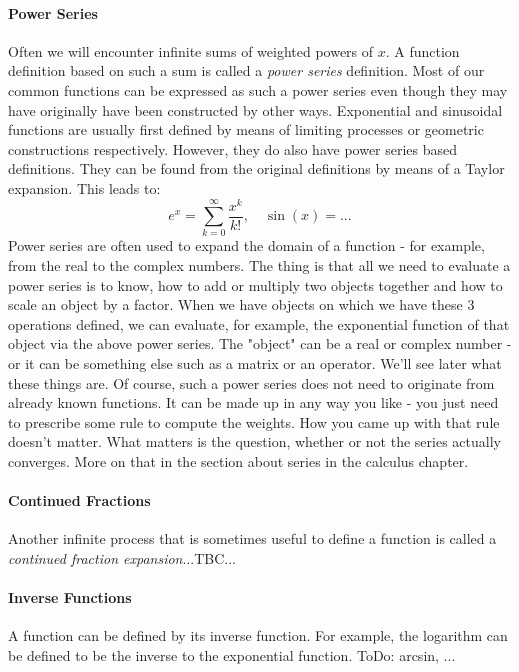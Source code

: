 \paragraph{Power Series}
Often we will encounter infinite sums of weighted powers of $x$. A function definition based on such a sum is called a \emph{power series} definition. Most of our common functions can be expressed as such a power series even though they may have originally have been constructed by other ways. Exponential and sinusoidal functions are usually first defined by means of limiting processes or geometric constructions respectively. However, they do also have power series based definitions. They can be found from the original definitions by means of a Taylor expansion. This leads to:
\begin{equation}
e^x = \sum_{k=0}^\infty \frac{x^k}{k!}, \quad
\sin(x) = ...
\end{equation}
Power series are often used to expand the domain of a function - for example, from the real to the complex numbers. The thing is that all we need to evaluate a power series is to know, how to add or multiply two objects together and how to scale an object by a factor. When we have objects on which we have these 3 operations defined, we can evaluate, for example, the exponential function of that object via the above power series. The "object" can be a real or complex number - or it can be something else such as a matrix or an operator. We'll see later what these things are. Of course, such a power series does not need to originate from already known functions. It can be made up in any way you like - you just need to prescribe some rule to compute the weights. How you came up with that rule doesn't matter. What matters is the question, whether or not the series actually converges. More on that in the section about series in the calculus chapter.

\paragraph{Continued Fractions}
Another infinite process that is sometimes useful to define a function is called a \emph{continued fraction expansion}...TBC...

\paragraph{Inverse Functions}
A function can be defined by its inverse function. For example, the logarithm can be defined to be the inverse to the exponential function. ToDo: arcsin, ...

